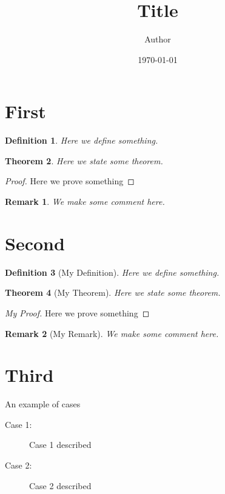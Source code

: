 \documentclass[10pt]{article}
\title{Title}
\author{Author}
\date{\today}
\newtheorem{theorem}{Theorem}[section]
\newtheorem{definition}[theorem]{Definition}
\newtheorem*{remark}{Remark}
\begin{document}

\maketitle

\section{First}

\begin{definition}
  Here we define something.
\end{definition}

\begin{theorem}
  Here we state some theorem.
\end{theorem}

\begin{proof}
  Here we prove something \qedhere
\end{proof}

\begin{remark}
  We make some comment here.
\end{remark}

\section{Second}

\begin{definition}[My Definition]
  Here we define something.
\end{definition}

\begin{theorem}[My Theorem]
  Here we state some theorem.
\end{theorem}

\begin{proof}[My Proof]
  Here we prove something \qedhere
\end{proof}

\begin{remark}[My Remark]
  We make some comment here.
\end{remark}

\section{Third}

An example of cases

\begin{description}
  \item[Case 1:] Case 1 described
  \item[Case 2:] Case 2 described
\end{description}
\end{document}
